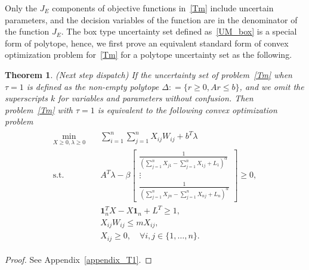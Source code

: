 \documentclass[10pt,twocolumn,twoside,english]{IEEEtran}
\newtheorem{theorem}{Theorem}
\begin{document}
Only the $J_E$ components of objective functions in~\eqref{Tm} include uncertain parameters, and the decision variables of the function are in the denominator of the function $J_E$. The box type uncertainty set defined as~\eqref{UM_box} is a special form of polytope, hence, we first prove an equivalent standard form of convex optimization problem for~\eqref{Tm} for a polytope uncertainty set as the following.
\begin{theorem} (Next step dispatch)
If the uncertainty set of problem~\eqref{Tm} when $\tau=1$ is defined as the non-empty polytope $\Delta : =\{ r \geq 0, Ar \leq b\}$, and we omit the superscripts $k$ for variables and parameters without confusion. Then problem~\eqref{Tm} with $\tau=1$ is equivalent to the following convex optimization problem
 \begin{align}
\begin{split}
\underset{X\geq 0,\lambda \geq 0}{\text{min}} \quad &\sum_{i=1}^{n} \sum_{j=1}^{n}X_{ij} W_{ij}+b^T\lambda \\
\text{s.t.}\quad\quad &A^T\lambda-\beta\begin{bmatrix} \frac{1}{\left (\sum\limits_{j=1}^{n} X_{j1}-\sum\limits_{j=1}^{n} X_{1j} + L_1 \right)^\alpha} \\ \vdots \\ \frac{1}{\left (\sum\limits_{j=1}^{n} X_{jn}-\sum\limits_{j=1}^{n} X_{nj} + L_n \right)^\alpha}\end{bmatrix}    \geq 0,\\
&\mathbf{1}^T_n X-X \mathbf{1}_n +L^T \geqslant 1,\\
&  X_{ij} W_{ij} \leq m X_{ij},\\
& X_{ij}\geq 0,\quad \forall i, j \in \{1, \dots, n\}.
\end{split}
\label{conv_T1}
\end{align} 
 \label{T1_convex}
\end{theorem}
\begin{proof}
See Appendix~\ref{appendix_T1}.
\end{proof}
\end{document}
